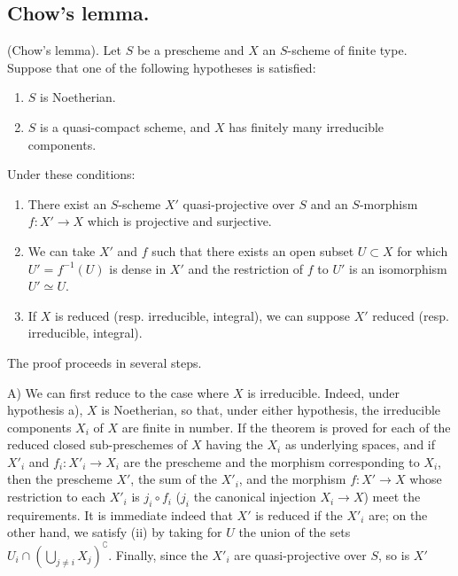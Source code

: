 \subsection{Chow's lemma.}
\label{subsection:II.5.6}

\begin{theorem}[5.6.1]
\label{II.5.6.1}
(Chow's lemma). Let $S$ be a prescheme and $X$ an $S$-scheme of finite type.
Suppose that one of the following hypotheses is satisfied:
\begin{enumerate}
  \item[\rm{a)}] $S$ is Noetherian.
  \item[\rm{b)}] $S$ is a quasi-compact scheme, and $X$ has finitely many
  irreducible components.
\end{enumerate}
Under these conditions:
\begin{enumerate}
  \item[\rm{(i)}] There exist an $S$-scheme $X'$ quasi-projective over $S$
  and an $S$-morphism $f:X'\to X$ which is projective and surjective.
  \item[\rm{(ii)}] We can take $X'$ and $f$ such that there exists an open
  subset $U\subset X$ for which $U'=f^{-1}(U)$ is dense in $X'$ and the
  restriction of $f$ to $U'$ is an isomorphism $U'\simeq U$.
  \item[\rm{(iii)}] If $X$ is reduced (resp. irreducible, integral), we can
  suppose $X'$ reduced (resp. irreducible, integral).
\end{enumerate}
\end{theorem}

The proof proceeds in several steps.

A) We can first reduce to the case where $X$ is irreducible. Indeed, under
hypothesis a), $X$ is Noetherian, so that, under either hypothesis, the
irreducible components $X_i$ of $X$ are finite in number. If the theorem is
proved for each of the reduced closed sub-preschemes of $X$ having the $X_i$
as underlying spaces, and if $X'_i$ and $f_i:X'_i\to X_i$ are the prescheme
and the morphism corresponding to $X_i$, then the prescheme $X'$, the sum of
the $X'_i$, and the morphism $f:X'\to X$ whose restriction to each $X'_i$ is
$j_i\circ f_i$ ($j_i$ the canonical injection $X_i\to X$) meet the
requirements. It is immediate indeed that $X'$ is reduced if the $X'_i$ are;
on the other hand, we satisfy (ii) by taking for $U$ the union of the sets
$U_i\cap(\bigcup_{j\neq i}X_j)^{\complement}$. Finally, since the $X'_i$ are
quasi-projective over $S$, so is $X'$

